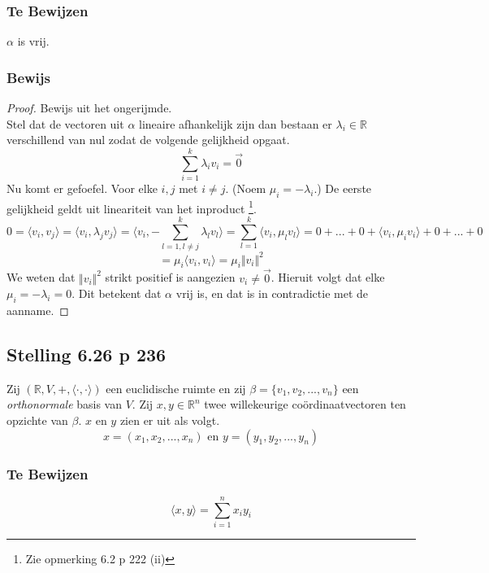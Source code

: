 \documentclass[lineaire_algebra_oplossingen.tex]{subfiles}
\begin{document}
\subsubsection*{Te Bewijzen}
$\alpha$ is vrij.

\subsubsection*{Bewijs}
\begin{proof}
Bewijs uit het ongerijmde.\\
Stel dat de vectoren uit $\alpha$ lineaire afhankelijk zijn dan bestaan er $\lambda_i \in \mathbb{R}$ verschillend van nul zodat de volgende gelijkheid opgaat.
\[
\sum_{i=1}^k \lambda_iv_i = \vec{0}
\]
Nu komt er gefoefel. Voor elke $i, j$ met $i\neq j$. (Noem $\mu_i =-\lambda_i $.)
De eerste gelijkheid geldt uit lineariteit van het inproduct \footnote{Zie opmerking 6.2 p 222 (ii)}.
\[
0 = \langle v_i, v_j \rangle = \langle v_i, \lambda_jv_j \rangle = \langle v_i, -\sum_{l=1, l\neq j}^k \lambda_lv_l \rangle = \sum_{l= 1}^k\langle v_i, \mu_lv_l\rangle = 0 + ... + 0 + \langle v_i,\mu_i v_i\rangle + 0 + ... + 0
\]
\[
= \mu_i \langle v_i,v_i\rangle = \mu_i \Vert v_i\Vert^2
\]
We weten dat $\Vert v_i\Vert^2$ strikt positief is aangezien $v_i \neq \vec{0}$. Hieruit volgt dat elke $\mu_i = -\lambda_i = 0$. Dit betekent dat $\alpha$ vrij is, en dat is in contradictie met de aanname.
\end{proof}


\subsection{Stelling 6.26 p 236}
\label{6.26}
Zij $(\mathbb{R}, V,+, \langle \cdot,\cdot \rangle)$ een euclidische ruimte en zij $\beta = \{v_1,v_2,...,v_n\}$ een \emph{orthonormale} basis van $V$. Zij $x,y\in \mathbb{R}^n$ twee willekeurige co\"ordinaatvectoren ten opzichte van $\beta$. $x$ en $y$ zien er uit als volgt.
\[
x = (x_1,x_2,...,x_n) \text { en } y = (y_1,y_2,...,y_n)
\]

\subsubsection*{Te Bewijzen}
\[
\langle x,y\rangle = \sum_{i=1}^nx_iy_i
\]
\end{document}
